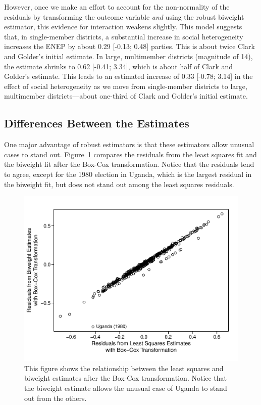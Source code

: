 \documentclass[12pt]{article}
\begin{document}
However, once we make an effort to account for the non-normality of the residuals by transforming the outcome variable \textit{and} using the robust biweight estimator, this evidence for interaction weakens slightly. 
This model suggests that, in single-member districts, a substantial increase in social heterogeneity increases the ENEP by about 0.29 [-0.13; 0.48] parties. 
This is about twice Clark and Golder's initial estimate.
In large, multimember districts (magnitude of 14), the estimate shrinks to 0.62 [-0.41; 3.34], which is about half of Clark and Golder's estimate. 
This leads to an estimated increase of 0.33 [-0.78; 3.14] in the effect of social heterogeneity as we move from single-member districts to large, multimember districts---about one-third of Clark and Golder's initial estimate.

\subsection*{Differences Between the Estimates}

One major advantage of robust estimators is that these estimators allow unusual cases to stand out. 
Figure~\ref{fig:cg-residuals-compare} compares the residuals from the least squares fit and the biweight fit after the Box-Cox transformation. 
Notice that the residuals tend to agree, except for the 1980 election in Uganda, which is the largest residual in the biweight fit, but does not stand out among the least squares residuals.

\begin{figure}[h!]
\begin{center}
\includegraphics[scale = 0.6]{figs/cg-residuals-compare.pdf}
\caption{This figure shows the relationship between the least squares and biweight estimates after the Box-Cox transformation. 
Notice that the biweight estimate allows the unusual case of Uganda to stand out from the others.}\label{fig:cg-residuals-compare}
\end{center}
\end{figure}
\end{document}

